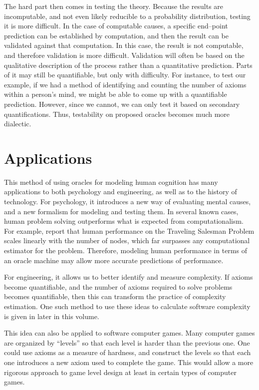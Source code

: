 The hard part then comes in testing the theory.  Because the results are incomputable, and not even likely reducible to a probability distribution, testing it is more difficult.  In the case of computable causes, a specific end--point prediction can be established by computation, and then the result can be validated against that computation.  In this case, the result is not computable, and therefore validation is more difficult.  Validation will often be based on the qualitative description of the process rather than a quantitative prediction.  Parts of it may still be quantifiable, but only with difficulty.  For instance, to test our example, if we had a method of identifying and counting the number of axioms within a person's mind, we might be able to come up with a quantifiable prediction.  However, since we cannot, we can only test it based on secondary quantifications.  Thus, testability on proposed oracles becomes much more dialectic.

\section{Applications}

This method of using oracles for modeling human cognition has many applications to both psychology and engineering, as well as to the history of technology.  For psychology, it introduces a new way of evaluating mental causes, and a new formalism for modeling and testing them.  In several known cases, human problem solving outperforms what is expected from computationalism.  For example, \citet{dryetal2006} report that human performance on the Traveling Salesman Problem scales linearly with the number of nodes, which far surpasses any computational estimator for the problem.  Therefore, modeling human performance in terms of an oracle machine may allow more accurate predictions of performance.

For engineering, it allows us to better identify and measure complexity.  If axioms become quantifiable, and the number of axioms required to solve problems becomes quantifiable, then this can transform the practice of complexity estimation.  One such method to use these ideas to calculate software complexity is given in \citet{bartlett2012} later in this volume.  

This idea can also be applied to software computer games.  Many computer games are organized by ``levels'' so that each level is harder than the previous one.  One could use axioms as a measure of hardness, and construct the levels so that each one introduces a new axiom used to complete the game.  This would allow a more rigorous approach to game level design at least in certain types of computer games.

